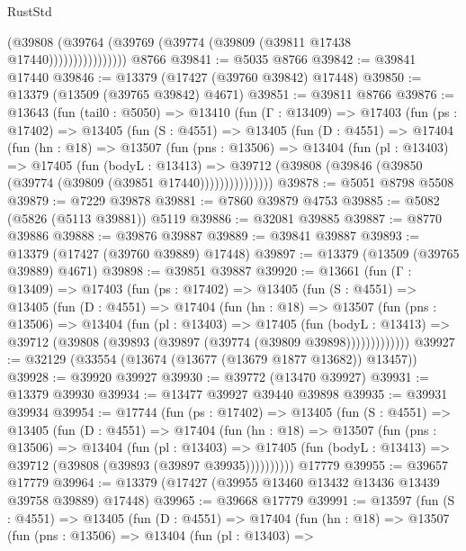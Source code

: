 \begin{lexlean}{RustStd}
\begin{coremodule}
                        (@39808
                          (@39764 (@39769 (@39774 (@39809 (@39811 @17438 @17440))))))))))))))))
    @8766
@39841 := @5035 @8766
@39842 := @39841 @17440
@39846 := @13379 (@17427 (@39760 @39842) @17448)
@39850 := @13379 (@13509 (@39765 @39842) @4671)
@39851 := @39811 @8766
@39876 := @13643
    (fun (tail0 : @5050) =>
    @13410
      (fun (Γ : @13409) =>
      @17403
        (fun (ps : @17402) =>
        @13405
          (fun (S : @4551) =>
          @13405
            (fun (D : @4551) =>
            @17404
              (fun (hn : @18) =>
              @13507
                (fun (pns : @13506) =>
                @13404
                  (fun (pl : @13403) =>
                  @17405
                    (fun (bodyL : @13413) =>
                    @39712 (@39808 (@39846 (@39850 (@39774 (@39809 (@39851 @17440)))))))))))))))
@39878 := @5051 @8798 @5508
@39879 := @7229 @39878
@39881 := @7860 @39879 @4753
@39885 := @5082 (@5826 (@5113 @39881)) @5119
@39886 := @32081 @39885
@39887 := @8770 @39886
@39888 := @39876 @39887
@39889 := @39841 @39887
@39893 := @13379 (@17427 (@39760 @39889) @17448)
@39897 := @13379 (@13509 (@39765 @39889) @4671)
@39898 := @39851 @39887
@39920 := @13661
    (fun (Γ : @13409) =>
    @17403
      (fun (ps : @17402) =>
      @13405
        (fun (S : @4551) =>
        @13405
          (fun (D : @4551) =>
          @17404
            (fun (hn : @18) =>
            @13507
              (fun (pns : @13506) =>
              @13404
                (fun (pl : @13403) =>
                @17405
                  (fun (bodyL : @13413) =>
                  @39712 (@39808 (@39893 (@39897 (@39774 (@39809 @39898)))))))))))))
@39927 := @32129 (@33554 (@13674 (@13677 (@13679 @1877 @13682)) @13457))
@39928 := @39920 @39927
@39930 := @39772 (@13470 @39927)
@39931 := @13379 @39930
@39934 := @13477 @39927 @39440 @39898
@39935 := @39931 @39934
@39954 := @17744
    (fun (ps : @17402) =>
    @13405
      (fun (S : @4551) =>
      @13405
        (fun (D : @4551) =>
        @17404
          (fun (hn : @18) =>
          @13507
            (fun (pns : @13506) =>
            @13404
              (fun (pl : @13403) =>
              @17405 (fun (bodyL : @13413) => @39712 (@39808 (@39893 (@39897 @39935))))))))))
    @17779
@39955 := @39657 @17779
@39964 := @13379 (@17427 (@39955 @13460 @13432 @13436 @13439 @39758 @39889) @17448)
@39965 := @39668 @17779
@39991 := @13597
    (fun (S : @4551) =>
    @13405
      (fun (D : @4551) =>
      @17404
        (fun (hn : @18) =>
        @13507
          (fun (pns : @13506) =>
          @13404
            (fun (pl : @13403) =>

\end{coremodule}
\end{lexlean}

